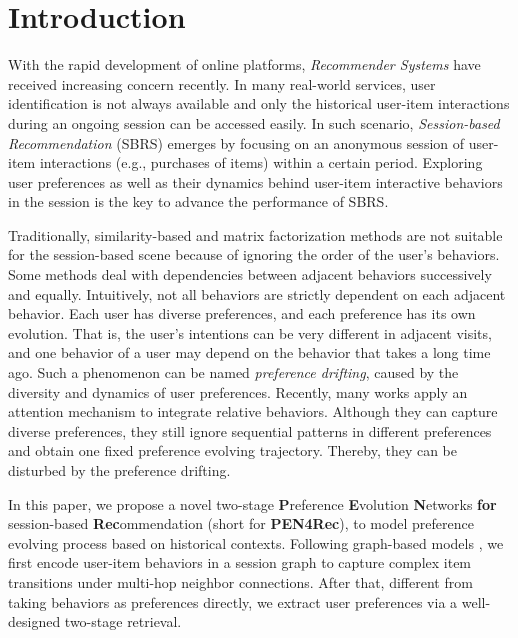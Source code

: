 \documentclass[runningheads]{llncs}
\begin{document}
\section{Introduction}
With the rapid development of online platforms, \textit{Recommender Systems} \cite{DBLP:conf/www/LiuRZC0Y20,DBLP:journals/ml/ZhangLG19} have received increasing concern recently.
In many real-world services, user identification is not always available and only the historical user-item interactions during an ongoing session can be accessed easily.
In such scenario, \textit{Session-based Recommendation} (SBRS) \cite{DBLP:conf/sigecom/SchaferKR99} emerges by focusing on an anonymous session of user-item interactions (e.g., purchases of items) within a certain period. 
Exploring user preferences as well as their dynamics behind user-item interactive behaviors in the session is the key to advance the performance of SBRS.




Traditionally, similarity-based \cite{DBLP:conf/www/SarwarKKR01} and matrix factorization \cite{DBLP:conf/uai/RendleFGS09,DBLP:reference/rsh/KorenB11} methods are not suitable for the session-based scene because of ignoring the order of the user's behaviors.
Some methods \cite{DBLP:conf/www/RendleFS10,DBLP:journals/corr/HidasiKBT15} deal with dependencies between adjacent behaviors successively and equally. 
Intuitively, not all behaviors are strictly dependent on each adjacent behavior. 
Each user has diverse preferences, and each preference has its own evolution.
That is, the user's intentions can be very different in adjacent visits, and one behavior of a user may depend on the behavior that takes a long time ago. Such a phenomenon can be named \textit{preference drifting},  caused by the diversity and dynamics of user preferences.
Recently, many works \cite{DBLP:conf/cikm/LiRCRLM17,DBLP:conf/sigir/WangRMCMR19,DBLP:conf/kdd/LiuZMZ18,DBLP:conf/aaai/WuT0WXT19,DBLP:conf/ijcai/XuZLSXZFZ19} apply an attention mechanism to integrate relative behaviors. Although they can capture diverse preferences, they still ignore sequential patterns in different preferences and obtain one fixed preference evolving trajectory. Thereby, they can be disturbed by the preference drifting.





In  this paper, we propose a novel two-stage {\bf P}reference {\bf E}volution {\bf N}etworks {\bf for} session-based {\bf Rec}ommendation (short for {\bf PEN4Rec}), to model preference evolving process based on historical contexts.
Following graph-based models \cite{DBLP:conf/aaai/WuT0WXT19,DBLP:conf/ijcai/XuZLSXZFZ19}, we first encode user-item behaviors in a session graph to capture complex item transitions under multi-hop neighbor connections. 
After that, different from taking behaviors as preferences directly, we extract user preferences via a well-designed two-stage retrieval. 
\end{document}
